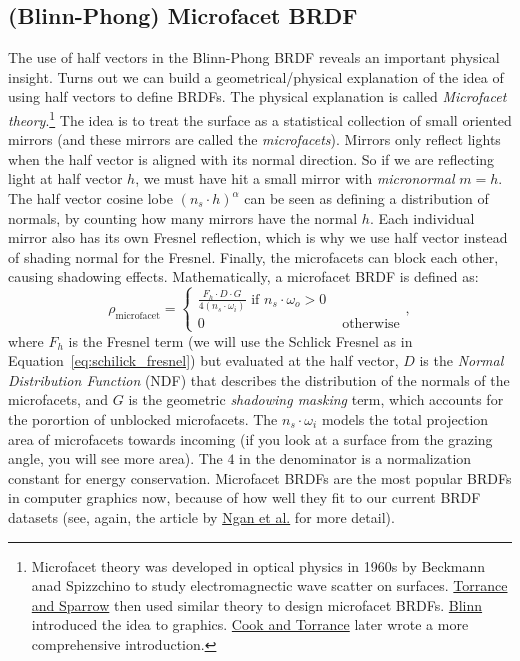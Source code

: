 \subsection{(Blinn-Phong) Microfacet BRDF}
The use of half vectors in the Blinn-Phong BRDF reveals an important physical insight.
Turns out we can build a geometrical/physical explanation of the idea of using half vectors to define BRDFs. The physical explanation is called \emph{Microfacet theory}.\footnote{Microfacet theory was developed in optical physics in 1960s by Beckmann anad Spizzchino to study electromagnectic wave scatter on surfaces. \href{https://www.graphics.cornell.edu/~westin/pubs/TorranceSparrowJOSA1967.pdf}{Torrance and Sparrow} then used similar theory to design microfacet BRDFs. \href{https://dl.acm.org/doi/10.1145/965141.563893}{Blinn} introduced the idea to graphics. \href{https://graphics.pixar.com/library/ReflectanceModel/paper.pdf}{Cook and Torrance} later wrote a more comprehensive introduction.} The idea is to treat the surface as a statistical collection of small oriented mirrors (and these mirrors are called the \emph{microfacets}). Mirrors only reflect lights when the half vector is aligned with its normal direction. So if we are reflecting light at half vector $h$, we must have hit a small mirror with \emph{micronormal} $m=h$. The half vector cosine lobe $\left(n_s \cdot h\right)^{\alpha}$ can be seen as defining a distribution of normals, by counting how many mirrors have the normal $h$. Each individual mirror also has its own Fresnel reflection, which is why we use half vector instead of shading normal for the Fresnel. Finally, the microfacets can block each other, causing shadowing effects. Mathematically, a microfacet BRDF is defined as:
\begin{equation}
\rho_{\text{microfacet}} = \begin{cases}
\frac{F_h \cdot D \cdot G}{4 \left(n_s \cdot \omega_i\right)} \text{ if } n_s \cdot \omega_o > 0 \\
0 & \text{ otherwise} 
\end{cases},
\label{eq:microfacet}
\end{equation}
where $F_h$ is the Fresnel term (we will use the Schlick Fresnel as in Equation~\eqref{eq:schilick_fresnel}) but evaluated at the half vector, $D$ is the \emph{Normal Distribution Function} (NDF) that describes the distribution of the normals of the microfacets, and $G$ is the geometric \emph{shadowing masking} term, which accounts for the porortion of unblocked microfacets. The $n_s \cdot \omega_i$ models the total projection area of microfacets towards incoming (if you look at a surface from the grazing angle, you will see more area). The $4$ in the denominator is a normalization constant for energy conservation.
Microfacet BRDFs are the most popular BRDFs in computer graphics now, because of how well they fit to our current BRDF datasets (see, again, the article by \href{http://people.csail.mit.edu/addy/research/brdf/index.html}{Ngan et al.} for more detail).

